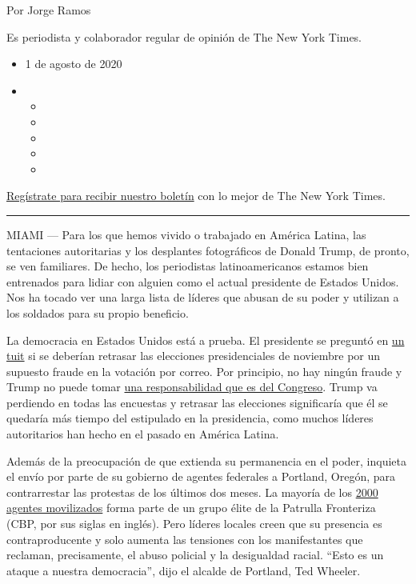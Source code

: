 Por Jorge Ramos

Es periodista y colaborador regular de opinión de The New York Times.

\begin{itemize}
\item
  1 de agosto de 2020
\item
  \begin{itemize}
  \item
  \item
  \item
  \item
  \item
  \end{itemize}
\end{itemize}

\href{https://www.nytimes.com/newsletters/el-times}{Regístrate para
recibir nuestro boletín} con lo mejor de The New York Times.

\begin{center}\rule{0.5\linewidth}{\linethickness}\end{center}

MIAMI --- Para los que hemos vivido o trabajado en América Latina, las
tentaciones autoritarias y los desplantes fotográficos de Donald Trump,
de pronto, se ven familiares. De hecho, los periodistas latinoamericanos
estamos bien entrenados para lidiar con alguien como el actual
presidente de Estados Unidos. Nos ha tocado ver una larga lista de
líderes que abusan de su poder y utilizan a los soldados para su propio
beneficio.

La democracia en Estados Unidos está a prueba. El presidente se preguntó
en
\href{https://twitter.com/realDonaldTrump/status/1288818160389558273}{un
tuit} si se deberían retrasar las elecciones presidenciales de noviembre
por un supuesto fraude en la votación por correo. Por principio, no hay
ningún fraude y Trump no puede tomar
\href{https://www.nytimes.com/es/2020/07/30/espanol/estados-unidos/trump-retrasar-elecciones.html}{una
responsabilidad que es del Congreso}. Trump va perdiendo en todas las
encuestas y retrasar las elecciones significaría que él se quedaría más
tiempo del estipulado en la presidencia, como muchos líderes
autoritarios han hecho en el pasado en América Latina.

Además de la preocupación de que extienda su permanencia en el poder,
inquieta el envío por parte de su gobierno de agentes federales a
Portland, Oregón, para contrarrestar las protestas de los últimos dos
meses. La mayoría de los
\href{https://www.nytimes.com/2020/07/17/us/portland-protests.html}{2000
agentes movilizados} forma parte de un grupo élite de la Patrulla
Fronteriza (CBP, por sus siglas en inglés). Pero líderes locales creen
que su presencia es contraproducente y solo aumenta las tensiones con
los manifestantes que reclaman, precisamente, el abuso policial y la
desigualdad racial. ``Esto es un ataque a nuestra democracia'', dijo el
alcalde de Portland, Ted Wheeler.

